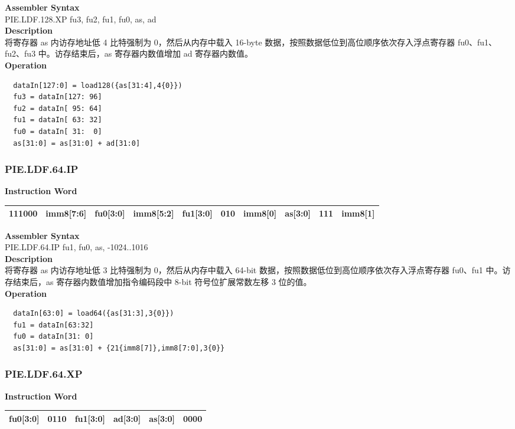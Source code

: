 \textbf{Assembler Syntax} \\
PIE.LDF.128.XP fu3, fu2, fu1, fu0, as, ad \\
\textbf{Description} \\
将寄存器 as 内访存地址低 4 比特强制为 0，然后从内存中载入 16-byte 数据，按照数据低位到高位顺序依次存入浮点寄存器 fu0、fu1、fu2、fu3 中。访存结束后，as 寄存器内数值增加 ad 寄存器内数值。\\
\textbf{Operation}
\begin{lstlisting}
  dataIn[127:0] = load128({as[31:4],4{0}})
  fu3 = dataIn[127: 96]
  fu2 = dataIn[ 95: 64]
  fu1 = dataIn[ 63: 32]
  fu0 = dataIn[ 31:  0]
  as[31:0] = as[31:0] + ad[31:0]
\end{lstlisting}

\newpage
\subsubsection{PIE.LDF.64.IP}\label{instruction:PIELDF64IP}
\setlength\tabcolsep{6pt}
\textbf{Instruction Word} \\
\begin{tabular}{|c|c|c|c|c|c|c|c|c|c|}
	\hline
	111000 & imm8[7:6] & fu0[3:0] & imm8[5:2] & fu1[3:0] & 010 & imm8[0] & as[3:0] & 111 & imm8[1] \\
	\hline
\end{tabular}

\textbf{Assembler Syntax} \\
PIE.LDF.64.IP fu1, fu0, as, -1024..1016 \\
\textbf{Description} \\
将寄存器 as 内访存地址低 3 比特强制为 0，然后从内存中载入 64-bit 数据，按照数据低位到高位顺序依次存入浮点寄存器 fu0、fu1 中。访存结束后，as 寄存器内数值增加指令编码段中 8-bit 符号位扩展常数左移 3 位的值。\\
\textbf{Operation}
\begin{lstlisting}
  dataIn[63:0] = load64({as[31:3],3{0}})
  fu1 = dataIn[63:32]
  fu0 = dataIn[31: 0]
  as[31:0] = as[31:0] + {21{imm8[7]},imm8[7:0],3{0}}
\end{lstlisting}

\newpage
\subsubsection{PIE.LDF.64.XP}\label{instruction:PIELDF64XP}
\setlength\tabcolsep{6pt}
\textbf{Instruction Word} \\
\begin{tabular}{|c|c|c|c|c|c|}
	\hline
	fu0[3:0] & 0110 & fu1[3:0] & ad[3:0] & as[3:0] & 0000 \\
	\hline
\end{tabular}

